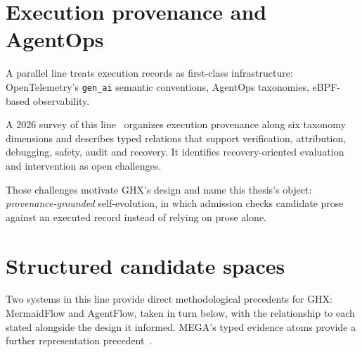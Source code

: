\section{Execution provenance and AgentOps}
\label{sec:provenance}

A parallel line treats execution records as first-class infrastructure:
OpenTelemetry's \texttt{gen\_ai} semantic conventions, AgentOps
taxonomies, eBPF-based observability.

A 2026 survey of this line~\cite{survey-provenance} organizes execution
provenance along six taxonomy dimensions and describes typed relations that
support verification, attribution, debugging, safety, audit and recovery. It
identifies recovery-oriented evaluation and intervention as open challenges.

Those challenges motivate GHX's design and name this thesis's object: \emph{provenance-grounded} self-evolution, in which admission checks candidate prose against an executed record
instead of relying on prose alone.

\section{Structured candidate spaces}
\label{sec:structured-spaces}

Two systems in this line provide direct methodological precedents for GHX:
MermaidFlow and AgentFlow, taken in turn below, with the relationship to
each stated alongside the design it informed. MEGA's typed evidence atoms
provide a further representation precedent~\cite{mega}.

